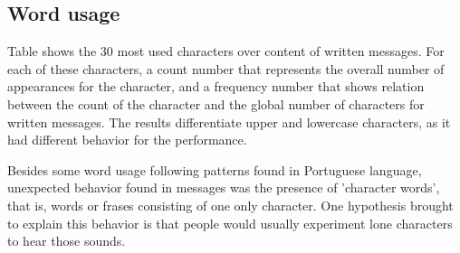 \documentclass{aes2e}
\begin{document}
\subsection{Word usage}

Table shows the 30 most used characters over content of written messages. For each of these characters, a count number that represents the overall number of appearances for the character, and a frequency number that shows relation between the count of the character and the global number of characters for written messages. The results differentiate upper and lowercase characters, as it had different behavior for the performance.

Besides some word usage following patterns found in Portuguese language, unexpected behavior found in messages was the presence of 'character words', that is, words or frases consisting of one only character. One hypothesis brought to explain this behavior is that people would usually experiment lone characters to hear those sounds.
\end{document}
